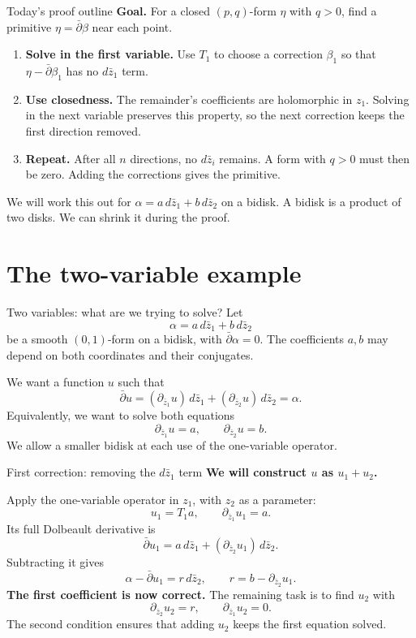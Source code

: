 \documentclass[aspectratio=169,11pt]{beamer}
\newcommand{\db}{\bar\partial}
\begin{document}
\begin{frame}{Today's proof outline}
\textbf{Goal.} For a closed $(p,q)$-form $\eta$ with $q>0$, find a
primitive $\eta=\db\beta$ near each point.
\begin{enumerate}
\item \textbf{Solve in the first variable.}
Use $T_1$ to choose a correction $\beta_1$ so that
$\eta-\db\beta_1$ has no $d\bar z_1$ term.

\item \textbf{Use closedness.}
The remainder's coefficients are holomorphic in $z_1$.
Solving in the next variable preserves this property, so the next
correction keeps the first direction removed.

\item \textbf{Repeat.}
After all $n$ directions, no $d\bar z_i$ remains.
A form with $q>0$ must then be zero.
Adding the corrections gives the primitive.
\end{enumerate}
We will work this out for $\alpha=a\,d\bar z_1+b\,d\bar z_2$ on a bidisk.
A bidisk is a product of two disks. We can shrink it during the proof.
\end{frame}

\section{The two-variable example}

\begin{frame}{Two variables: what are we trying to solve?}
Let
\[
 \alpha=a\,d\bar z_1+b\,d\bar z_2
\]
be a smooth $(0,1)$-form on a bidisk, with $\db\alpha=0$.
The coefficients $a,b$ may depend on both coordinates and their conjugates.

We want a function $u$ such that
\[
 \db u=(\partial_{\bar z_1}u)\,d\bar z_1
       +(\partial_{\bar z_2}u)\,d\bar z_2=\alpha.
\]
Equivalently, we want to solve both equations
\[
 \boxed{\partial_{\bar z_1}u=a,\qquad\partial_{\bar z_2}u=b.}
\]
We allow a smaller bidisk at each use of the one-variable operator.
\end{frame}

\begin{frame}{First correction: removing the $d\bar z_1$ term}
\textbf{We will construct $u$ as $u_1+u_2$.}

Apply the one-variable operator in $z_1$, with $z_2$ as a parameter:
\[
 u_1=T_1a,\qquad \partial_{\bar z_1}u_1=a.
\]
Its full Dolbeault derivative is
\[
 \db u_1=a\,d\bar z_1+(\partial_{\bar z_2}u_1)\,d\bar z_2.
\]
Subtracting it gives
\[
 \boxed{\alpha-\db u_1=r\,d\bar z_2,\qquad
 r=b-\partial_{\bar z_2}u_1.}
\]
\textbf{The first coefficient is now correct.}
The remaining task is to find $u_2$ with
\[
 \partial_{\bar z_2}u_2=r,\qquad \partial_{\bar z_1}u_2=0.
\]
The second condition ensures that adding $u_2$ keeps the first equation solved.
\end{frame}
\end{document}
